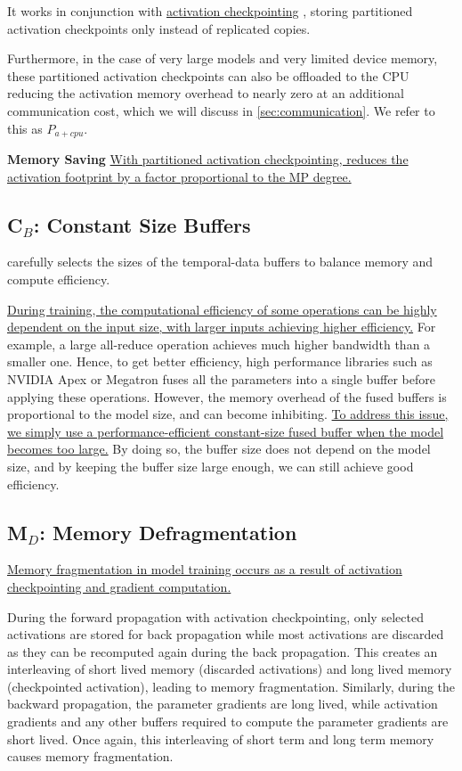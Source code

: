 It works in conjunction with \uline{activation checkpointing} \cite{DBLP:journals/corr/ChenXZG16}, storing partitioned activation checkpoints only instead of replicated copies.

Furthermore, in the case of very large models and very limited device memory, these partitioned activation checkpoints can also be offloaded to the CPU reducing the activation memory overhead to nearly zero at an additional communication cost, which we will discuss in \ref{sec:communication}. We refer to this as \uline{$P_{a+cpu}$}.

\textbf{Memory Saving} \uline{With partitioned activation checkpointing, \name reduces the activation footprint by a factor proportional to the MP degree.} 

\subsection{C$_B$: Constant Size Buffers}\label{sec:buffer}

\name carefully selects the sizes of the temporal-data buffers to balance memory and compute efficiency.

\uline{During training, the computational efficiency of some operations can be highly dependent on the input size, with larger inputs achieving higher efficiency.} For example, a large all-reduce operation achieves much higher bandwidth than a smaller one. Hence, to get better efficiency, high performance libraries such as NVIDIA Apex or Megatron fuses all the parameters into a single buffer before applying these operations. However, the memory overhead of the fused buffers is proportional to the model size, and can become inhibiting. \uline{To address this issue, we simply use a performance-efficient constant-size fused buffer when the model becomes too large.} By doing so, the buffer size does not depend on the model size, and by keeping the buffer size large enough, we can still achieve good efficiency.

\subsection{M$_D$: Memory Defragmentation}

\uline{Memory fragmentation in model training occurs as a result of activation checkpointing and gradient computation.}

During the forward propagation with activation checkpointing, only selected activations are stored for back propagation while most activations are discarded as they can be recomputed again during the back propagation. This creates an interleaving of short lived memory (discarded activations) and long lived memory (checkpointed activation), leading to memory fragmentation. Similarly, during the backward propagation, the parameter gradients are long lived, while activation gradients and any other buffers required to compute the parameter gradients are short lived. Once again, this interleaving of short term and long term memory causes memory fragmentation.


